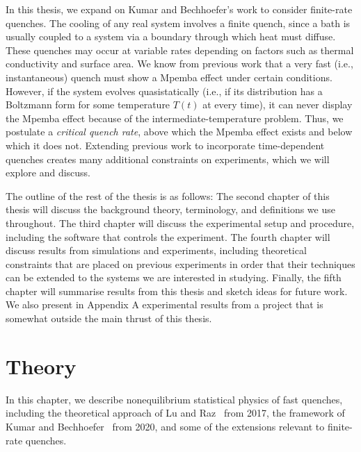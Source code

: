 \documentclass[hyperref={colorlinks=true, urlcolor=blue, citecolor=blue, final, bound}]{sfuthesis}
\begin{document}
In this thesis, we expand on Kumar and Bechhoefer's work to consider finite-rate quenches. The cooling of any real system involves a finite quench, since a bath is usually coupled to a system via a boundary through which heat must diffuse. These quenches may occur at variable rates depending on factors such as thermal conductivity and surface area. We know from previous work that a very fast (i.e., instantaneous) quench must show a Mpemba effect under certain conditions. However, if the system evolves quasistatically (i.e., if its distribution has a Boltzmann form for some temperature $T(t)$ at every time), it can never display the Mpemba effect because of the intermediate-temperature problem. Thus, we postulate a \textit{critical quench rate}, above which the Mpemba effect exists and below which it does not. Extending previous work to incorporate time-dependent quenches creates many additional constraints on experiments, which we will explore and discuss.

The outline of the rest of the thesis is as follows: The second chapter of this thesis will discuss the background theory, terminology, and definitions we use throughout. The third chapter will discuss the experimental setup and procedure, including the software that controls the experiment. The fourth chapter will discuss results from simulations and experiments, including theoretical constraints that are placed on previous experiments in order that their techniques can be extended to the systems we are interested in studying. Finally, the fifth chapter will summarise results from this thesis and sketch ideas for future work. We also present in Appendix A experimental results from a project that is somewhat outside the main thrust of this thesis.

\chapter{Theory}
In this chapter, we describe nonequilibrium statistical physics of fast quenches, including the theoretical approach of Lu and Raz~\cite{Lu2017} from 2017, the framework of Kumar and Bechhoefer~\cite{Kumar2020} from 2020, and some of the extensions relevant to finite-rate quenches. 
\end{document}

